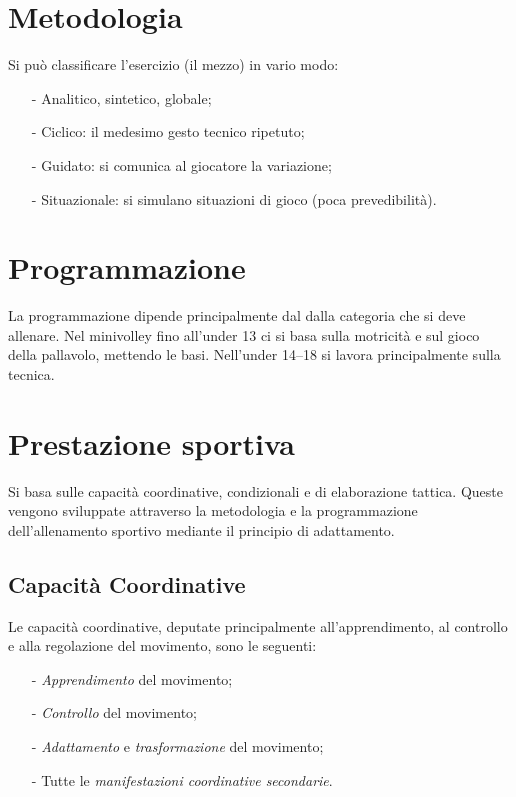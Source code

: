 \section{Metodologia}
Si può classificare l'esercizio (il mezzo) in vario modo:
\begin{itemize}
\item[-]Analitico, sintetico, globale;
\item[-]Ciclico: il medesimo gesto tecnico ripetuto;
\item[-]Guidato: si comunica al giocatore la variazione;
\item[-]Situazionale: si simulano situazioni di gioco (poca prevedibilità).
\end{itemize}


\section{Programmazione}
La programmazione dipende principalmente dal dalla categoria che si deve
allenare. Nel minivolley fino all'under 13 ci si basa sulla motricità e sul
gioco della pallavolo, mettendo le basi. Nell'under 14--18 si lavora
principalmente sulla tecnica.

\section{Prestazione sportiva}
Si basa sulle capacità coordinative, condizionali e di elaborazione tattica.
Queste vengono sviluppate attraverso la metodologia e la programmazione
dell'allenamento sportivo mediante il principio di adattamento.

\subsection{Capacità Coordinative}
Le capacità coordinative, deputate principalmente all'apprendimento, al 
controllo e alla regolazione del movimento, sono le seguenti:
\begin{itemize}
\item[-]\emph{Apprendimento} del movimento;
\item[-]\emph{Controllo} del movimento;
\item[-]\emph{Adattamento} e \emph{trasformazione} del movimento;
\item[-]Tutte le \emph{manifestazioni coordinative secondarie}.
\end{itemize}

